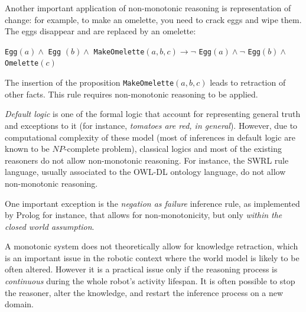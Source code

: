 \documentclass[a4paper, twocolumn]{article}
\newcommand{\concept}[1]{{\footnotesize \texttt{#1}}}
\begin{document}
Another important application of non-monotonic reasoning is representation of
change: for example, to make an omelette, you need to crack eggs and wipe them.
The eggs disappear and are replaced by an omelette:

\concept{Egg}$(a) \wedge $ \concept{Egg} $(b) \wedge $
\concept{MakeOmelette}$(a, b, c) \to \lnot $ \concept{Egg}$(a) \wedge \lnot $
\concept{Egg}$(b) \wedge $ \concept{Omelette}$(c)$

The insertion of the proposition \concept{MakeOmelette}$(a, b, c)$ leads to
retraction of other facts. This rule requires non-monotonic reasoning to be
applied.

\emph{Default logic} is one of the formal logic that account for representing
general truth and exceptions to it (for instance, \emph{tomatoes are red, in
general}). However, due to computational complexity of these model (most of
inferences in default logic are known to be $NP$-complete problem), classical
logics and most of the existing reasoners do not allow non-monotonic reasoning.
For instance, the SWRL rule language, usually associated to the OWL-DL ontology
language, do not allow non-monotonic reasoning.


One important exception is the \emph{negation as failure} inference rule, as
implemented by {\sc Prolog} for instance, that allows for non-monotonicity, but
only \emph{within the closed world assumption}.


A monotonic system does not theoretically allow for knowledge retraction,
which is an important issue in the robotic context where the world model is
likely to be often altered.  However it is a practical issue only if the
reasoning process is \emph{continuous} during the whole robot's activity
lifespan. It is often possible to stop the reasoner, alter the knowledge, and
restart the inference process on a new domain.

\end{document}
